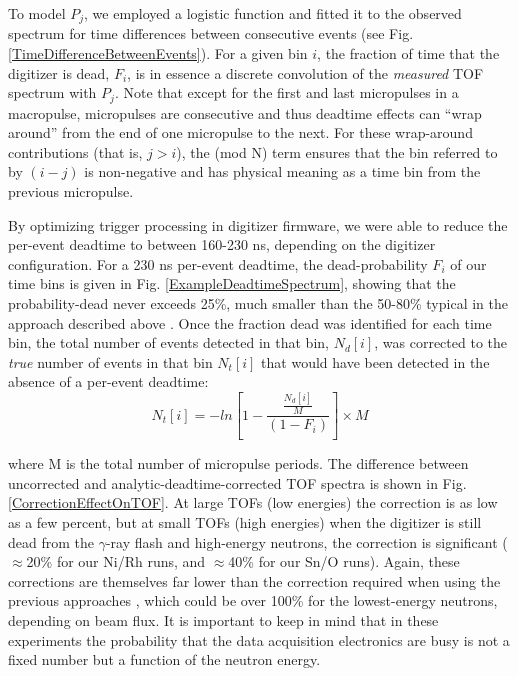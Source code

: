 To model $P_{j}$, we
employed a logistic function and fitted it to the observed spectrum for time
differences between consecutive events (see Fig.  \ref{TimeDifferenceBetweenEvents}).
For a given bin $i$, the fraction of time that the 
digitizer is dead, $F_{i}$, is in essence a discrete convolution of the
\textit{measured} TOF spectrum with $P_{j}$. Note that except for the first and
last micropulses in a macropulse, micropulses are consecutive and thus deadtime effects can
``wrap around'' from the end of one micropulse to the next. For these wrap-around
contributions (that is, $j>i$), the (mod N) term ensures that the bin referred
to by $(i-j)$ is non-negative and has physical meaning as a time bin from the previous 
micropulse.

By optimizing trigger processing in digitizer firmware,
we were able to reduce the per-event deadtime to between 160-230 ns,
depending on the digitizer configuration.
For a 230 ns per-event deadtime, the dead-probability
$F_{i}$ of our time bins is given in Fig.
\ref{ExampleDeadtimeSpectrum}, showing that the probability-dead never exceeds
25\%, much smaller than the 50-80\% typical in the approach described above
\cite{Finlay1993, Abfalterer2001}.
Once the fraction dead was identified for each time bin, the total number of
events detected in that bin, $N_{d}[i]$, was corrected to the \textit{true}
number of events in that bin $N_{t}[i]$ that would have been detected in the
absence of a per-event deadtime:
\begin{equation} \label{DeadtimeEquation}
    N_{t}[i] = -ln\left[1-\frac{\frac{N_{d}[i]}{M}}{(1-F_{i})}\right]\times M
\end{equation}

\noindent
where M is the total number of micropulse periods. The difference between
uncorrected and analytic-deadtime-corrected TOF spectra is shown in Fig.
\ref{CorrectionEffectOnTOF}. At large TOFs (low energies) the correction is as low as a
few percent, but at small TOFs (high energies) when the digitizer is still dead
from the $\gamma$-ray flash and high-energy neutrons, the correction is significant
($\approx$20\% for our Ni/Rh runs, and $\approx$40\% for our Sn/O runs). Again, these 
corrections are themselves far lower than the correction required
when using the previous approaches \cite{Finlay1993, Abfalterer2001}, which
could be over 100\% for the lowest-energy neutrons, depending on beam flux. It is
important to keep in mind that in these experiments the probability that the
data acquisition electronics are busy is not a fixed number but a
function of the neutron energy.

